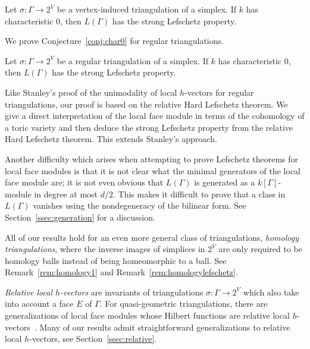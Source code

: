 \begin{conj}\label{conj:char0}
Let $\sigma \colon \Gamma \to 2^V$ be a vertex-induced triangulation of a simplex. If $k$ has characteristic $0$, then $L(\Gamma)$ has the strong Lefschetz property. 
\end{conj}

We prove Conjecture~\ref{conj:char0} for regular triangulations. 

\begin{theo}\label{thm:regular}
Let $\sigma \colon \Gamma \to 2^V$ be a regular triangulation of a simplex. If $k$ has characteristic $0$, then $L(\Gamma)$ has the strong Lefschetz property. 
\end{theo}

Like Stanley's proof of the unimodality of local $h$-vectors for regular triangulations, our proof is based on the relative Hard Lefschetz theorem. We give a direct interpretation of the local face module in terms of the cohomology of a toric variety and then deduce the strong Lefschetz property from the relative Hard Lefschetz theorem. This extends Stanley's approach. 

Another difficulty which arises when attempting to 
prove Lefschetz theorems for local face modules is that it is not clear what the minimal generators of the local face module are; it is not even obvious that $L(\Gamma)$ is generated as a $k[\Gamma]$-module in degree at most $d/2$. This makes it difficult to prove that a class in $L(\Gamma)$ vanishes using the nondegeneracy of the bilinear form. See Section~\ref{ssec:generation} for a discussion. 

\begin{rema}
All of our results hold for an even more general class of triangulations, \emph{homology triangulations}, where the inverse images of simplices in $2^V$ are only required to be homology balls instead of being homeomorphic to a ball. See Remark~\ref{rem:homology1} and Remark~\ref{rem:homologylefschetz}.
\end{rema}

\emph{Relative local $h$-vectors} are invariants of triangulations $\sigma \colon \Gamma \to 2^V$ which also take into account a face $E$ of $\Gamma$. For quasi-geometric triangulations, there are generalizations of local face modules whose Hilbert functions are relative local $h$-vectors~\cite{Athanasiadis12b,LPS1}.
Many of our results admit straightforward generalizations to relative local $h$-vectors, see Section~\ref{ssec:relative}.


